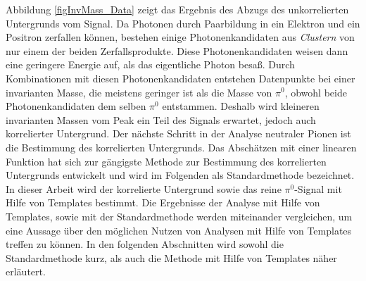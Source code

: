 \newline
Abbildung \ref{figInvMass_Data} zeigt das Ergebnis des Abzugs des unkorrelierten Untergrunds vom Signal.
Da Photonen durch Paarbildung in ein Elektron und ein Positron zerfallen können, bestehen einige Photonenkandidaten aus \textit{Clustern} von nur einem der beiden Zerfallsprodukte.
Diese Photonenkandidaten weisen dann eine geringere Energie auf, als das eigentliche Photon besaß.
Durch Kombinationen mit diesen Photonenkandidaten entstehen Datenpunkte bei einer invarianten Masse, die meistens geringer ist als die Masse von $\pi^{0}$, obwohl beide Photonenkandidaten dem selben $\pi^{0}$ entstammen.
Deshalb wird kleineren invarianten Massen vom Peak ein Teil des Signals erwartet, jedoch auch korrelierter Untergrund.
\newline
Der nächste Schritt in der Analyse neutraler Pionen ist die Bestimmung des korrelierten Untergrunds.
Das Abschätzen mit einer linearen Funktion hat sich zur gängigste Methode zur Bestimmung des korrelierten Untergrunds entwickelt und wird im Folgenden als Standardmethode bezeichnet.
In dieser Arbeit wird der korrelierte Untergrund sowie das reine $\pi^{0}$-Signal mit Hilfe von Templates bestimmt.
Die Ergebnisse der Analyse mit Hilfe von Templates, sowie mit der Standardmethode werden miteinander vergleichen, um eine Aussage über den möglichen Nutzen von Analysen mit Hilfe von Templates treffen zu können.
In den folgenden Abschnitten wird sowohl die Standardmethode kurz, als auch die Methode mit Hilfe von Templates näher erläutert.